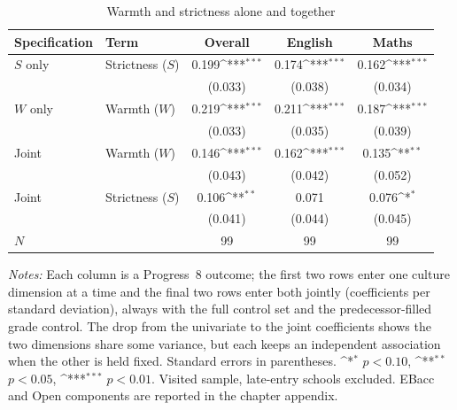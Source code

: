 \begin{table}[htbp]\centering
\caption{Warmth and strictness alone and together}
\label{tab:univariate_ws}
\def\sym#1{\ifmmode^{#1}\else\(^{#1}\)\fi}
\small
\begin{tabular}{llccc}
\toprule
Specification & Term & Overall & English & Maths \\
\midrule
$S$ only   & Strictness ($S$) & 0.199\sym{***}  & 0.174\sym{***}  & 0.162\sym{***}  \\
           &                  & (0.033)         & (0.038)         & (0.034)         \\
\addlinespace
$W$ only   & Warmth ($W$)     & 0.219\sym{***}  & 0.211\sym{***}  & 0.187\sym{***}  \\
           &                  & (0.033)         & (0.035)         & (0.039)         \\
\midrule
Joint      & Warmth ($W$)     & 0.146\sym{***}  & 0.162\sym{***}  & 0.135\sym{**}   \\
           &                  & (0.043)         & (0.042)         & (0.052)         \\
\addlinespace
Joint      & Strictness ($S$) & 0.106\sym{**}   & 0.071           & 0.076\sym{*}    \\
           &                  & (0.041)         & (0.044)         & (0.045)         \\
\midrule
$N$        &                  & 99            & 99            & 99            \\
\bottomrule
\end{tabular}
\begin{minipage}{\linewidth}
\smallskip
\footnotesize\textit{Notes:} Each column is a Progress~8 outcome; the first two rows enter one culture dimension at a time and the final two rows enter both jointly (coefficients per standard deviation), always with the full control set and the predecessor-filled grade control. The drop from the univariate to the joint coefficients shows the two dimensions share some variance, but each keeps an independent association when the other is held fixed. Standard errors in parentheses.
\sym{*} \(p<0.10\), \sym{**} \(p<0.05\), \sym{***} \(p<0.01\).
Visited sample, late-entry schools excluded. EBacc and Open components
are reported in the chapter appendix.
\end{minipage}
\end{table}
